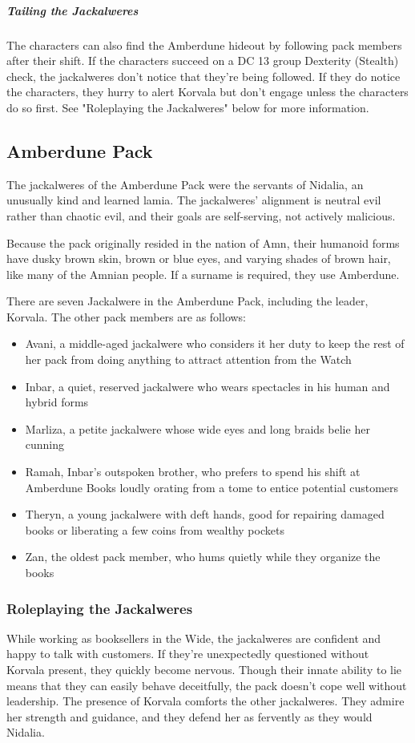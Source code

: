 \documentclass[10pt,a4paper,twoside,bg=print,twocolumn,openany,nodeprecatedcode]{dndbook}
\begin{document}
\subparagraph{Tailing the Jackalweres}
The characters can also find the Amberdune hideout by following pack members after their shift. If the characters succeed on a DC 13 group Dexterity (Stealth) check, the jackalweres don't notice that they're being followed. If they do notice the characters, they hurry to alert Korvala but don't engage unless the characters do so first. See "Roleplaying the Jackalweres" below for more information.

\subsection{Amberdune Pack}
The jackalweres of the Amberdune Pack were the servants of Nidalia, an unusually kind and learned lamia. The jackalweres' alignment is neutral evil rather than chaotic evil, and their goals are self-serving, not actively malicious.

Because the pack originally resided in the nation of Amn, their humanoid forms have dusky brown skin, brown or blue eyes, and varying shades of brown hair, like many of the Amnian people. If a surname is required, they use Amberdune.

There are seven Jackalwere in the Amberdune Pack, including the leader, Korvala. The other pack members are as follows:


\begin{itemize}
\item Avani, a middle-aged jackalwere who considers it her duty to keep the rest of her pack from doing anything to attract attention from the Watch
\item Inbar, a quiet, reserved jackalwere who wears spectacles in his human and hybrid forms
\item Marliza, a petite jackalwere whose wide eyes and long braids belie her cunning
\item Ramah, Inbar's outspoken brother, who prefers to spend his shift at Amberdune Books loudly orating from a tome to entice potential customers
\item Theryn, a young jackalwere with deft hands, good for repairing damaged books or liberating a few coins from wealthy pockets
\item Zan, the oldest pack member, who hums quietly while they organize the books
\end{itemize}

\subsubsection{Roleplaying the Jackalweres}
While working as booksellers in the Wide, the jackalweres are confident and happy to talk with customers. If they're unexpectedly questioned without Korvala present, they quickly become nervous. Though their innate ability to lie means that they can easily behave deceitfully, the pack doesn't cope well without leadership. The presence of Korvala comforts the other jackalweres. They admire her strength and guidance, and they defend her as fervently as they would Nidalia.
\end{document}
